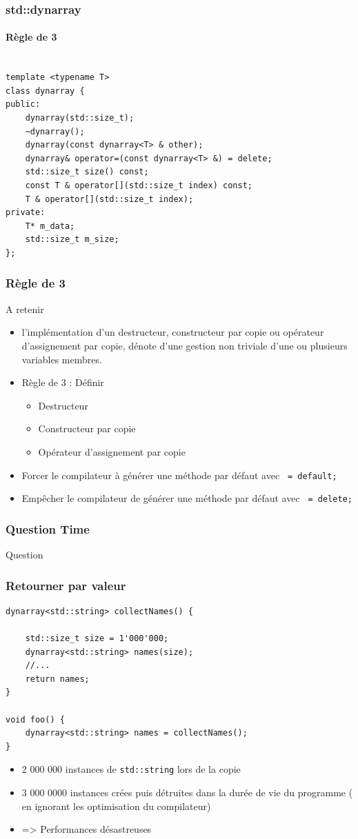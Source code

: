 \documentclass[xetex,mathserif]{beamer}
\newcounter{QC}
\begin{document}
\begin{frame}[containsverbatim]
\frametitle{std::dynarray}
\framesubtitle{Règle de 3}
\begin{lstlisting}

template <typename T>
class dynarray {
public:
	dynarray(std::size_t);
	~dynarray();
	dynarray(const dynarray<T> & other);
	dynarray& operator=(const dynarray<T> &) = delete;
	std::size_t size() const;
	const T & operator[](std::size_t index) const;
	T & operator[](std::size_t index);
private:
	T* m_data;
	std::size_t m_size;
};
\end{lstlisting}
\end{frame}


\begin{frame}[containsverbatim]
\frametitle{Règle de 3}
A retenir
\begin{itemize}
	\item l'implémentation d'un destructeur, constructeur par copie ou opérateur d'assignement par copie, dénote d'une gestion non triviale d'une
	ou plusieurs variables membres.
	\item Règle de 3 : Définir
		\begin{itemize} 
			\item Destructeur
			\item Constructeur par copie
			\item Opérateur d'assignement par copie
	 	\end{itemize}
	 \item Forcer le compilateur à générer une méthode par défaut avec \lstinline{ = default;}
	 \item Empêcher le compilateur de générer une méthode par défaut avec \lstinline{ = delete;}
\end{itemize}
\end{frame}

\begin{frame}
\frametitle{Question Time}
\huge Question  
\end{frame}

\begin{frame}[fragile]
\frametitle{Retourner par valeur}
\begin{lstlisting}
dynarray<std::string> collectNames() {
	
    std::size_t size = 1'000'000;
    dynarray<std::string> names(size);
    //...
    return names;
}

void foo() {
    dynarray<std::string> names = collectNames();
}
\end{lstlisting}
\begin{itemize} 
	\pause
	\item 2 000 000 instances de \lstinline{std::string} lors de la copie
	\pause
	\item 3 000 0000 instances crées puis détruites dans la durée de vie du programme ( en ignorant les optimisation du compilateur)
	\pause
	\item => Performances désastreuses
\end{itemize}
\end{frame}
\end{document}
